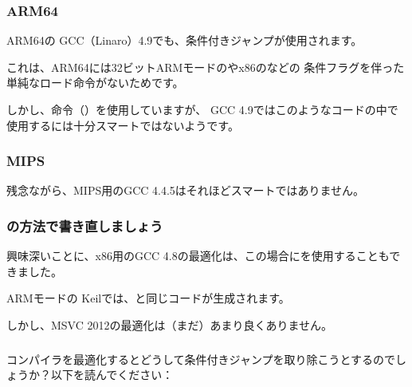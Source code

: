 

\subsubsection{ARM64}

ARM64の \Optimizing GCC（Linaro）4.9でも、条件付きジャンプが使用されます。



これは、ARM64には32ビットARMモードのやx86のなどの
条件フラグを伴った単純なロード命令がないためです。

しかし、命令（）を使用していますが、
GCC 4.9ではこのようなコードの中で使用するには十分スマートではないようです。

\subsubsection{MIPS}

残念ながら、MIPS用のGCC 4.4.5はそれほどスマートではありません。



\subsubsection{の方法で書き直しましょう}




興味深いことに、x86用のGCC 4.8の最適化は、この場合にを使用することもできました。



ARMモードの \Optimizing Keilでは、と同じコードが生成されます。

しかし、MSVC 2012の最適化は（まだ）あまり良くありません。

\subsubsection{\Conclusion{}}

コンパイラを最適化するとどうして条件付きジャンプを取り除こうとするのでしょうか？以下を読んでください：

